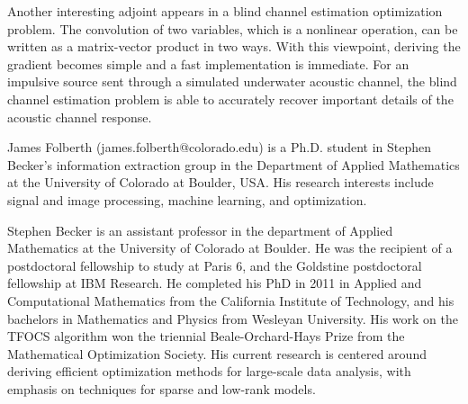 \documentclass[journal]{IEEEtran}
\begin{document}
Another interesting adjoint appears in a blind channel estimation optimization problem.  The convolution of two variables, which is a nonlinear operation, can be written as a matrix-vector product in two ways.  With this viewpoint, deriving the gradient becomes simple and a fast implementation is immediate.  For an impulsive source sent through a simulated underwater acoustic channel, the blind channel estimation problem is able to accurately recover important details of the acoustic channel response.





\begin{IEEEbiographynophoto}{James Folberth}
(james.folberth@colorado.edu) is a Ph.D. student in Stephen Becker's information extraction group in the Department of Applied Mathematics at the University of Colorado at Boulder, USA.  His research interests include signal and image processing, machine learning, and optimization.
\end{IEEEbiographynophoto}

\begin{IEEEbiographynophoto}{Stephen Becker} is an assistant professor in the department of Applied Mathematics at  the University of Colorado at Boulder. He was the recipient of a postdoctoral fellowship to study at Paris 6, and the Goldstine postdoctoral fellowship at IBM Research. He completed his PhD in 2011 in Applied and Computational Mathematics from the California Institute of Technology, and his bachelors in Mathematics and Physics from Wesleyan University. His work on the TFOCS algorithm won the triennial Beale-Orchard-Hays Prize from the Mathematical Optimization Society.
   His current research is centered around deriving efficient optimization methods for large-scale data analysis, with emphasis on techniques for sparse and low-rank models.
\end{IEEEbiographynophoto}
\end{document}
